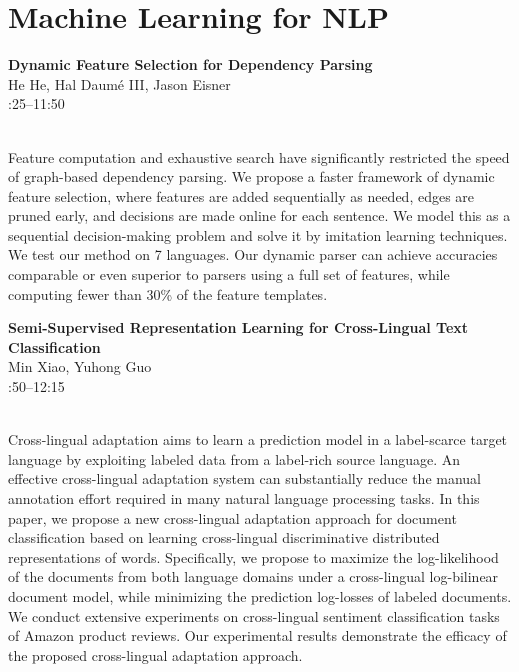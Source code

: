 \documentclass[twoside,makeidx]{book}
\renewcommand{\normalsize}{\fontsize{8}{9}\selectfont}
\renewcommand{\small}{\fontsize{7}{8}\selectfont}
\begin{document}
\section{Machine Learning for NLP}
\vspace{-1em}
\par\vspace{2em}\noindent%
\begin{minipage}{\linewidth}%
\begin{center}
\textbf{\normalsize Dynamic Feature Selection for Dependency Parsing}\\
\normalsize  He He,  Hal Daum\'{e} III,  Jason Eisner\\
{\small 11:25--11:50}\\
\end{center}
\end{minipage}\\[0.5em]
\nopagebreak%
\noindent%
{\small Feature computation and exhaustive search  have significantly restricted the speed of  graph-based dependency parsing. We propose  a faster framework of dynamic feature selection,  where features are added sequentially as  needed, edges are pruned early, and decisions  are made online for each sentence. We model  this as a sequential decision-making problem  and solve it by imitation learning techniques.  We test our method on 7 languages. Our dynamic parser can achieve accuracies  comparable or even superior to parsers using  a full set of features, while computing fewer  than 30\% of the feature templates.}
\par\vspace{2em}\noindent%
\begin{minipage}{\linewidth}%
\begin{center}
\textbf{\normalsize Semi-Supervised Representation Learning for Cross-Lingual Text Classification}\\
\normalsize  Min Xiao,  Yuhong Guo\\
{\small 11:50--12:15}\\
\end{center}
\end{minipage}\\[0.5em]
\nopagebreak%
\noindent%
{\small Cross-lingual adaptation aims to learn a prediction model in a label-scarce target language by exploiting labeled data from a label-rich source language. An effective cross-lingual adaptation system can substantially reduce the manual annotation effort required in many natural language processing tasks. In this paper, we propose a new cross-lingual adaptation approach for document classification based on learning cross-lingual discriminative distributed representations of words. Specifically, we propose to maximize the log-likelihood of the documents from both language domains under a cross-lingual log-bilinear document model, while minimizing the prediction log-losses of labeled documents. We conduct extensive experiments on cross-lingual sentiment classification tasks of Amazon product reviews. Our experimental results demonstrate the efficacy of the proposed cross-lingual adaptation approach.}
\end{document}
